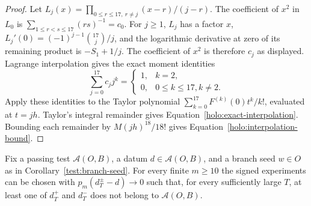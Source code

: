 \begin{proof}
Let $L_j(x)=\prod_{0\leq r\leq17,\ r\ne j}(x-r)/(j-r)$.
The coefficient of $x^2$ in $L_0$ is
$\sum_{1\leq r<s\leq17}(rs)^{-1}=c_0$.  For $j\geq1$,
$L_j$ has a factor $x$,
$L_j'(0)=(-1)^{j-1}\binom{17}{j}/j$, and the logarithmic
derivative at zero of its remaining product is $-S_1+1/j$.
The coefficient of $x^2$ is therefore $c_j$ as displayed.
Lagrange interpolation gives the exact moment identities
\[
 \sum_{j=0}^{17}c_jj^k=
     \begin{cases}1,&k=2,\\0,&0\leq k\leq17, k\ne2.
     \end{cases}
\]
Apply these identities to the Taylor polynomial
$\sum_{k=0}^{17}F^{(k)}(0)t^k/k!$, evaluated at $t=jh$.
Taylor's integral remainder gives
Equation~\eqref{holo:exact-interpolation}.  Bounding each remainder
by $M(jh)^{18}/18!$ gives
Equation~\eqref{holo:interpolation-bound}.
\end{proof}

\begin{proposition}
\label{holo:violation}
Fix a passing test $\mathcal A(O,B)$, a datum
$d\in\mathcal A(O,B)$, and a branch seed $w\in O$ as in
Corollary~\ref{test:branch-seed}.  For every finite $m\geq10$ the
signed experiments can be chosen with
$p_m(d_T^\pm-d)\to0$ such that, for every sufficiently large $T$,
at least one of $d_T^+$ and $d_T^-$ does not belong to
$\mathcal A(O,B)$.
\end{proposition}

